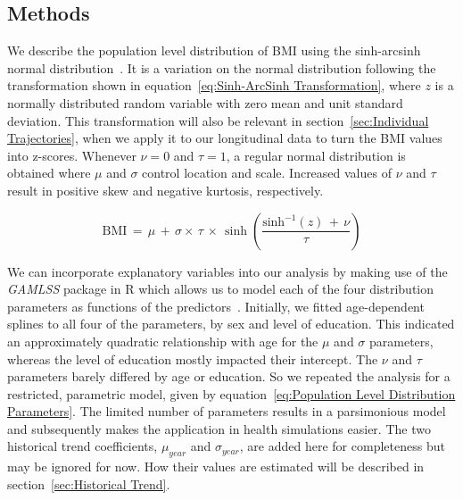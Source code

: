 \documentclass{imammb}
\numberwithin{equation}{section}
\begin{document}
\subsection{Methods}
\label{sec:Population Level Distribution/Methods}

We describe the population level distribution of BMI using the sinh-arcsinh normal distribution~\citep{Jones2009, Jones2019}. It is a variation on the normal distribution following the transformation shown in equation~\ref{eq:Sinh-ArcSinh Transformation}, where $z$ is a normally distributed random variable with zero mean and unit standard deviation. This transformation will also be relevant in section~\ref{sec:Individual Trajectories}, when we apply it to our longitudinal data to turn the BMI values into z-scores. Whenever $\nu = 0$ and $\tau =  1$, a regular normal distribution is obtained where $\mu$ and $\sigma$ control location and scale. Increased values of $\nu$ and $\tau$ result in positive skew and negative kurtosis, respectively.

\vspace{-1mm}

\begin{equation}
\label{eq:Sinh-ArcSinh Transformation}
\text{BMI} \, = \, \mu \, + \, \sigma \times \, \tau \, \times \, \sinh \left(\frac{\text{sinh}^{-1}(z) \, + \, \nu}{\tau}\right)
\end{equation}

\vspace{1mm}

We can incorporate explanatory variables into our analysis by making use of the \textit{GAMLSS} package in R which allows us to model each of the four distribution parameters as functions of the predictors~\citep{Rigby2005, Stasinopoulos2007, R2021}. Initially, we fitted age-dependent splines to all four of the parameters, by sex and level of education. This indicated an approximately quadratic relationship with age for the $\mu$ and $\sigma$ parameters, whereas the level of education mostly impacted their intercept. The $\nu$ and $\tau$ parameters barely differed by age or education. So we repeated the analysis for a restricted, parametric model, given by equation~\ref{eq:Population Level Distribution Parameters}. The limited number of parameters results in a parsimonious model and subsequently makes the application in health simulations easier. The two historical trend coefficients, $\mu_{year}$ and $\sigma_{year}$, are added here for completeness but may be ignored for now. How their values are estimated will be described in section~\ref{sec:Historical Trend}.
\end{document}
